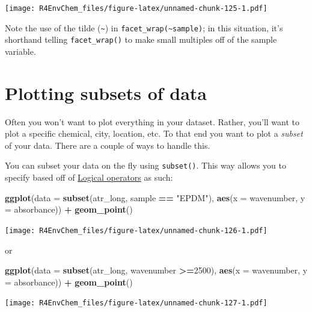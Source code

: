 \documentclass[
]{book}
\newenvironment{Shaded}{\begin{snugshade}}{\end{snugshade}}
\newcommand{\AttributeTok}[1]{\textcolor[rgb]{0.13,0.29,0.53}{#1}}
\newcommand{\DecValTok}[1]{\textcolor[rgb]{0.00,0.00,0.81}{#1}}
\newcommand{\FunctionTok}[1]{\textcolor[rgb]{0.13,0.29,0.53}{\textbf{#1}}}
\newcommand{\NormalTok}[1]{#1}
\newcommand{\SpecialCharTok}[1]{\textcolor[rgb]{0.81,0.36,0.00}{\textbf{#1}}}
\newcommand{\StringTok}[1]{\textcolor[rgb]{0.31,0.60,0.02}{#1}}
\begin{document}
\texttt{[image: R4EnvChem\_files/figure-latex/unnamed-chunk-125-1.pdf]}

Note the use of the tilde (\texttt{\textasciitilde{}}) in \texttt{facet\_wrap(\textasciitilde{}sample)}; in this situation, it's shorthand telling \texttt{facet\_wrap()} to make small multiples off of the sample variable.

\hypertarget{plotting-subsets-of-data}{%
\section{Plotting subsets of data}\label{plotting-subsets-of-data}}

Often you won't want to plot everything in your dataset. Rather, you'll want to plot a specific chemical, city, location, etc. To that end you want to plot a \emph{subset} of your data. There are a couple of ways to handle this.

You can subset your data on the fly using \texttt{subset()}. This way allows you to specify based off of \protect\hyperlink{logical-operators}{Logical operators} as such:

\begin{Shaded}
\begin{Highlighting}[]
\FunctionTok{ggplot}\NormalTok{(}\AttributeTok{data =} \FunctionTok{subset}\NormalTok{(atr\_long, sample }\SpecialCharTok{==} \StringTok{"EPDM"}\NormalTok{),}
       \FunctionTok{aes}\NormalTok{(}\AttributeTok{x =}\NormalTok{ wavenumber, }
           \AttributeTok{y =}\NormalTok{ absorbance)) }\SpecialCharTok{+}
  \FunctionTok{geom\_point}\NormalTok{()}
\end{Highlighting}
\end{Shaded}

\texttt{[image: R4EnvChem\_files/figure-latex/unnamed-chunk-126-1.pdf]}

or

\begin{Shaded}
\begin{Highlighting}[]
\FunctionTok{ggplot}\NormalTok{(}\AttributeTok{data =} \FunctionTok{subset}\NormalTok{(atr\_long, wavenumber }\SpecialCharTok{\textgreater{}=}\DecValTok{2500}\NormalTok{),}
       \FunctionTok{aes}\NormalTok{(}\AttributeTok{x =}\NormalTok{ wavenumber, }
           \AttributeTok{y =}\NormalTok{ absorbance)) }\SpecialCharTok{+}
  \FunctionTok{geom\_point}\NormalTok{()}
\end{Highlighting}
\end{Shaded}

\texttt{[image: R4EnvChem\_files/figure-latex/unnamed-chunk-127-1.pdf]}
\end{document}
